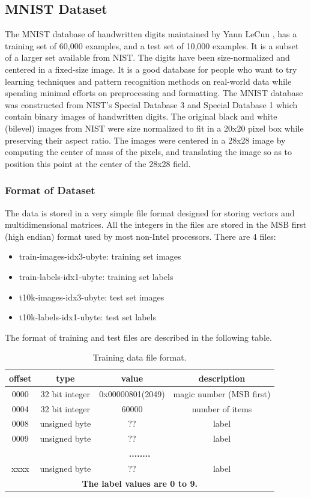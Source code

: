 \subsection{MNIST Dataset}
The MNIST database of handwritten digits maintained by Yann LeCun \cite{MNIST}, has a training set of 60,000 examples, and a test set of 10,000 examples. It is a subset of a larger set available from NIST. The digits have been size-normalized and centered in a fixed-size image. It is a good database for people who want to try learning techniques and pattern recognition methods on real-world data while spending minimal efforts on preprocessing and formatting. The MNIST database was constructed from NIST's Special Database 3 and Special Database 1 which contain binary images of handwritten digits. The original black and white (bilevel) images from NIST were size normalized to fit in a 20x20 pixel box while preserving their aspect ratio. The images were centered in a 28x28 image by computing the center of mass of the pixels, and translating the image so as to position this point at the center of the 28x28 field.

\subsubsection{Format of Dataset}
The data is stored in a very simple file format designed for storing vectors and multidimensional matrices. All the integers in the files are stored in the MSB first (high endian) format used by most non-Intel processors. There are 4 files:
\begin{itemize}
  \item train-images-idx3-ubyte: training set images
  \item train-labels-idx1-ubyte: training set labels
  \item t10k-images-idx3-ubyte:  test set images
  \item t10k-labels-idx1-ubyte:  test set labels
\end{itemize}
The format of training and test files are described in the following table.
\begin{table}[ht]
\centering
\begin{tabular}{|c|c|c|c|}
\hline
\textbf{offset} & \textbf{type}    &      \textbf{value}    &      \textbf{description} \\
\hline
0000  &   32 bit integer & 0x00000801(2049) & magic number (MSB first) \\
\hline
0004  &   32 bit integer & 60000       &     number of items \\
\hline
0008  &   unsigned byte  & ??          &     label \\
\hline
0009  &   unsigned byte  & ??          &     label \\
\hline
\multicolumn{4}{|c|}{\textbf{........}} \\
\hline
xxxx  &   unsigned byte  & ??          &     label \\
\hline
\multicolumn{4}{|c|}{\textbf{The label values are 0 to 9.}} \\
\hline
\end{tabular}
\caption{Training data file format.}
\label{tbl:training-file-format}
\end{table}

